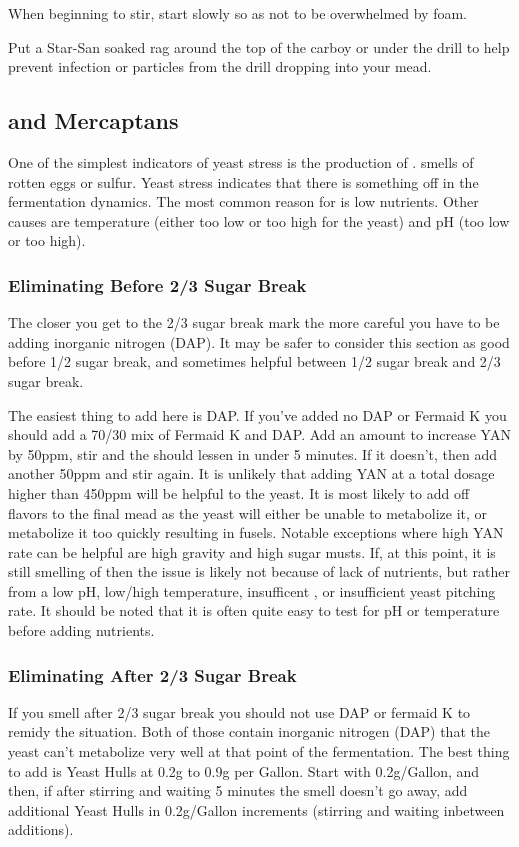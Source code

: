 \documentclass{article}
\begin{document}
   When beginning to stir, start slowly so as not to be overwhelmed by foam. 

   Put a Star-San soaked rag around the top of the carboy or under the drill to help prevent infection or particles 
   from the drill dropping into your mead.

 \subsection{ and Mercaptans}
  One of the simplest indicators of yeast stress is the production of .  smells of rotten eggs or 
  sulfur. Yeast stress indicates that there is something off in the fermentation dynamics. The most common reason 
  for  is low nutrients. Other causes are temperature (either too low or too high for the yeast) and pH 
  (too low or too high).

  \subsubsection{Eliminating Before 2/3 Sugar Break}
   The closer you get to the 2/3 sugar break mark the more careful you have to be adding inorganic nitrogen (DAP). 
   It may be safer to consider this section as good before 1/2 sugar break, and sometimes helpful between 1/2 sugar
   break and 2/3 sugar break.

   The easiest thing to add here is DAP. If you've added no DAP or Fermaid K you should add a 70/30 mix of Fermaid K
   and DAP. Add an amount to increase YAN by 50ppm, stir and the 
    should lessen in under 5 minutes. If it doesn't, then add another 50ppm and stir again. It is unlikely
   that adding YAN at a total dosage higher than 450ppm will be helpful to the yeast. 
   It is most likely to add off flavors to the final mead as the yeast will either be unable to metabolize it, 
   or metabolize it too quickly resulting in fusels. 
   Notable exceptions where high YAN rate can be helpful are high gravity and high sugar musts.
   If, at this point, it is still smelling of  then the issue is likely not because of lack of nutrients, 
   but rather from a low pH, low/high temperature, insufficent , or insufficient yeast pitching rate. 
   It should be noted that it is often quite easy to test for pH or temperature before adding nutrients.

  \subsubsection{Eliminating After 2/3 Sugar Break} 
   If you smell  after 2/3 sugar break you should not use DAP or fermaid K to remidy the situation. Both of
   those contain inorganic nitrogen (DAP) that the yeast can't metabolize very well at that point of the 
   fermentation. The best thing to add is Yeast Hulls at 0.2g to 0.9g per Gallon. Start with 0.2g/Gallon, and
   then, if after stirring and waiting 5 minutes the  smell doesn't go away, add additional Yeast Hulls 
   in 0.2g/Gallon increments (stirring and waiting inbetween additions).
\end{document}
